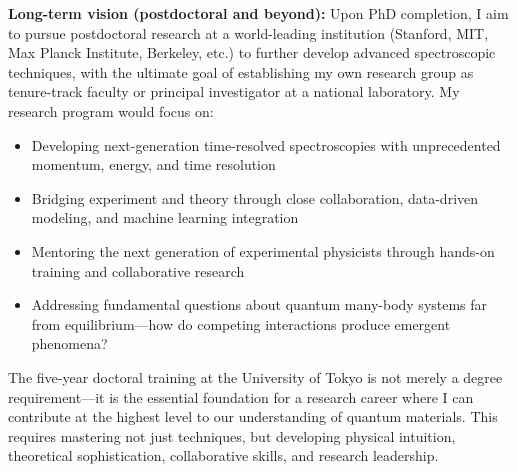 \documentclass[11pt,a4paper]{article}
\begin{document}
\textbf{Long-term vision (postdoctoral and beyond):} Upon PhD completion, I aim to pursue postdoctoral research at a world-leading institution (Stanford, MIT, Max Planck Institute, Berkeley, etc.) to further develop advanced spectroscopic techniques, with the ultimate goal of establishing my own research group as tenure-track faculty or principal investigator at a national laboratory. My research program would focus on:
\begin{itemize}
    \item Developing next-generation time-resolved spectroscopies with unprecedented momentum, energy, and time resolution
    \item Bridging experiment and theory through close collaboration, data-driven modeling, and machine learning integration
    \item Mentoring the next generation of experimental physicists through hands-on training and collaborative research
    \item Addressing fundamental questions about quantum many-body systems far from equilibrium—how do competing interactions produce emergent phenomena?
\end{itemize}

The five-year doctoral training at the University of Tokyo is not merely a degree requirement—it is the essential foundation for a research career where I can contribute at the highest level to our understanding of quantum materials. This requires mastering not just techniques, but developing physical intuition, theoretical sophistication, collaborative skills, and research leadership.
\end{document}
